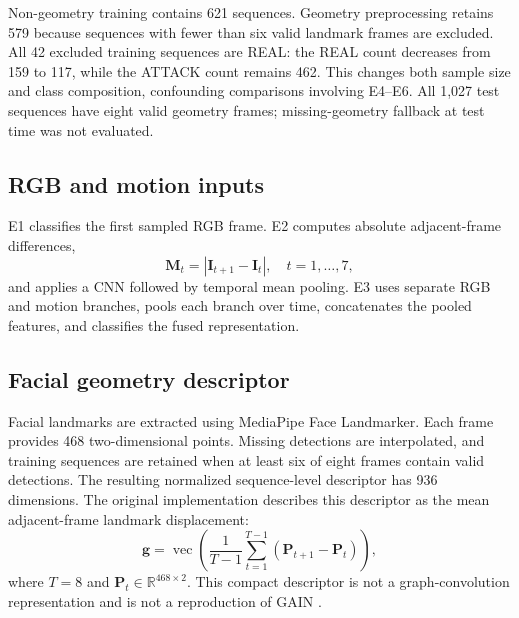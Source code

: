 \documentclass[a4paper,conference]{IEEEtran}
\begin{document}
Non-geometry training contains 621 sequences. Geometry preprocessing retains 579 because sequences with fewer than six valid landmark frames are excluded. All 42 excluded training sequences are REAL: the REAL count decreases from 159 to 117, while the ATTACK count remains 462. This changes both sample size and class composition, confounding comparisons involving E4--E6. All 1,027 test sequences have eight valid geometry frames; missing-geometry fallback at test time was not evaluated.

\subsection{RGB and motion inputs}
E1 classifies the first sampled RGB frame. E2 computes absolute adjacent-frame differences,
\begin{equation}
\mathbf{M}_t=|\mathbf{I}_{t+1}-\mathbf{I}_t|,\quad t=1,\ldots,7,
\end{equation}
and applies a CNN followed by temporal mean pooling. E3 uses separate RGB and motion branches, pools each branch over time, concatenates the pooled features, and classifies the fused representation.

\subsection{Facial geometry descriptor}
Facial landmarks are extracted using MediaPipe Face Landmarker. Each frame provides 468 two-dimensional points. Missing detections are interpolated, and training sequences are retained when at least six of eight frames contain valid detections. The resulting normalized sequence-level descriptor has 936 dimensions. The original implementation describes this descriptor as the mean adjacent-frame landmark displacement:
\begin{equation}
\mathbf{g}=\operatorname{vec}\left(\frac{1}{T-1}\sum_{t=1}^{T-1}(\mathbf{P}_{t+1}-\mathbf{P}_t)\right),
\label{eq:geometry}
\end{equation}
where $T=8$ and $\mathbf{P}_t\in\mathbb{R}^{468\times2}$. This compact descriptor is not a graph-convolution representation and is not a reproduction of GAIN \cite{chang2023geometry}.
\end{document}
